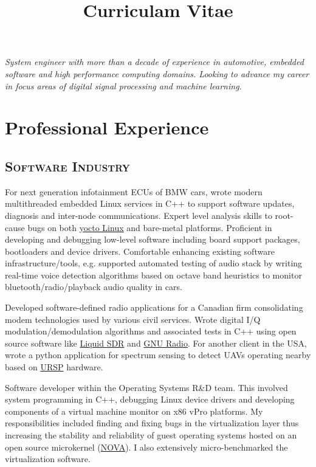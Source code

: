 \documentclass[nocolor,a4paper, colorlinks, linkcolor=true]{moderncv}
\title{Curriculam Vitae}
\begin{document}
\hypersetup{urlcolor=blue}
\maketitle
\par{\emph{System engineer with more than a decade of experience in automotive, embedded software and high performance computing domains. Looking to advance my career in focus areas of digital signal processing and machine learning.}}

\section{Professional Experience}
\subsection{\textsc{Software Industry}}
{For next generation infotainment ECUs of BMW cars, wrote modern multithreaded
embedded Linux services in C++ to support software updates, diagnosis and inter-node
communications. Expert level analysis skills to root-cause bugs on both
\href{https://www.yoctoproject.org/}{yocto Linux} and bare-metal platforms. Proficient in developing and debugging low-level software
including board support packages, bootloaders and device drivers. Comfortable enhancing existing software infrastructure/tools, e.g. supported automated testing of audio stack by writing real-time voice detection algorithms based on octave band heuristics to monitor bluetooth/radio/playback audio quality in cars.}

{Developed software-defined radio applications for a Canadian firm consolidating modem
technologies used by various civil services. Wrote digital I/Q modulation/demodulation
algorithms and associated tests in C++ using open source software like \href{https://liquidsdr.org}{Liquid SDR} and
\href{www.gnuradio.org}{GNU Radio}. For another client in the USA, wrote a python application for spectrum
sensing to detect UAVs operating nearby based on \href{https://www.ettus.com/sdr-software/uhd-usrp-hardware-driver/}{URSP} hardware.}

{Software developer within the Operating Systems R\&D team. This involved system programming in C++, debugging Linux device drivers and developing components of a virtual machine monitor on x86 vPro platforms. My responsibilities included finding and fixing bugs in the virtualization layer thus increasing the stability and reliability of guest operating systems hosted on an open source microkernel (\href{https://hypervisor.org}{NOVA}). I also extensively micro-benchmarked the virtualization software.}
\end{document}
